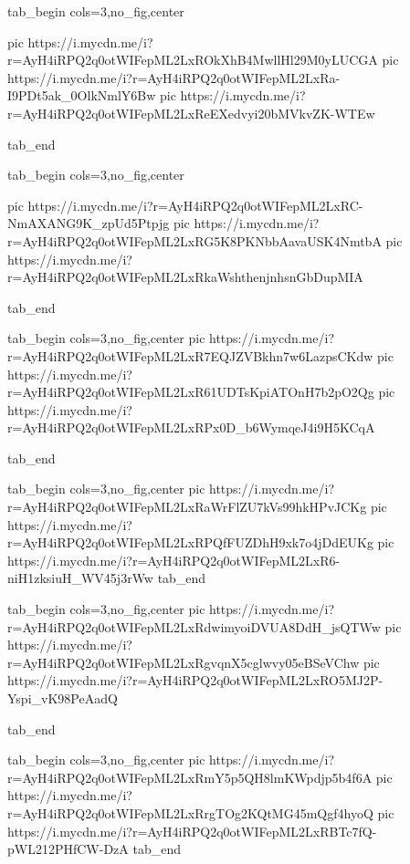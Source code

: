  
 
 
 
 


\ifcmt
  tab_begin cols=3,no_fig,center

     pic https://i.mycdn.me/i?r=AyH4iRPQ2q0otWIFepML2LxROkXhB4MwllHl29M0yLUCGA
		 pic https://i.mycdn.me/i?r=AyH4iRPQ2q0otWIFepML2LxRa-I9PDt5ak_0OlkNmlY6Bw
		 pic https://i.mycdn.me/i?r=AyH4iRPQ2q0otWIFepML2LxReEXedvyi20bMVkvZK-WTEw

  tab_end
\fi


\ifcmt
  tab_begin cols=3,no_fig,center

     pic https://i.mycdn.me/i?r=AyH4iRPQ2q0otWIFepML2LxRC-NmAXANG9K_zpUd5Ptpjg
		 pic https://i.mycdn.me/i?r=AyH4iRPQ2q0otWIFepML2LxRG5K8PKNbbAavaUSK4NmtbA
		 pic https://i.mycdn.me/i?r=AyH4iRPQ2q0otWIFepML2LxRkaWshthenjnhsnGbDupMIA

  tab_end
\fi

\ifcmt
  tab_begin cols=3,no_fig,center
		pic https://i.mycdn.me/i?r=AyH4iRPQ2q0otWIFepML2LxR7EQJZVBkhn7w6LazpsCKdw
		pic https://i.mycdn.me/i?r=AyH4iRPQ2q0otWIFepML2LxR61UDTsKpiATOnH7b2pO2Qg
		pic https://i.mycdn.me/i?r=AyH4iRPQ2q0otWIFepML2LxRPx0D_b6WymqeJ4i9H5KCqA

  tab_end
\fi

\ifcmt
  tab_begin cols=3,no_fig,center
		pic https://i.mycdn.me/i?r=AyH4iRPQ2q0otWIFepML2LxRaWrFlZU7kVs99hkHPvJCKg
		pic https://i.mycdn.me/i?r=AyH4iRPQ2q0otWIFepML2LxRPQfFUZDhH9xk7o4jDdEUKg
		pic https://i.mycdn.me/i?r=AyH4iRPQ2q0otWIFepML2LxR6-niH1zksiuH_WV45j3rWw
  tab_end
\fi

\ifcmt
	tab_begin cols=3,no_fig,center
		pic https://i.mycdn.me/i?r=AyH4iRPQ2q0otWIFepML2LxRdwimyoiDVUA8DdH_jsQTWw
		pic https://i.mycdn.me/i?r=AyH4iRPQ2q0otWIFepML2LxRgvqnX5cglwvy05eBSeVChw
		pic https://i.mycdn.me/i?r=AyH4iRPQ2q0otWIFepML2LxRO5MJ2P-Yspi_vK98PeAadQ

	tab_end
\fi

\ifcmt
	tab_begin cols=3,no_fig,center
		pic https://i.mycdn.me/i?r=AyH4iRPQ2q0otWIFepML2LxRmY5p5QH8lmKWpdjp5b4f6A
		pic https://i.mycdn.me/i?r=AyH4iRPQ2q0otWIFepML2LxRrgTOg2KQtMG45mQgf4hyoQ
		pic https://i.mycdn.me/i?r=AyH4iRPQ2q0otWIFepML2LxRBTc7fQ-pWL212PHfCW-DzA
	tab_end
\fi


